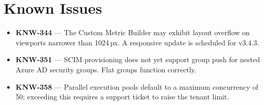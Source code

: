 \section{\faInfoCircle\hspace{6pt}Known Issues}

\begin{infobox}
  \small
  \begin{itemize}[leftmargin=*,nosep,itemsep=4pt,topsep=2pt]
    \item \textbf{KNW-344} --- The Custom Metric Builder may exhibit layout
      overflow on viewports narrower than 1024\,px. A responsive update is
      scheduled for v3.4.3.
    \item \textbf{KNW-351} --- SCIM provisioning does not yet support group
      push for nested Azure AD security groups. Flat groups function correctly.
    \item \textbf{KNW-358} --- Parallel execution pools default to a maximum
      concurrency of 50; exceeding this requires a support ticket to raise
      the tenant limit.
  \end{itemize}
\end{infobox}

